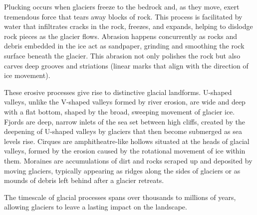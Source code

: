 Plucking occurs when glaciers freeze to the bedrock and, as they move, exert tremendous force that tears away blocks of rock. This process is facilitated by water that infiltrates cracks in the rock, freezes, and expands, helping to dislodge rock pieces as the glacier flows. Abrasion happens concurrently as rocks and debris embedded in the ice act as sandpaper, grinding and smoothing the rock surface beneath the glacier. This abrasion not only polishes the rock but also carves deep grooves and striations (linear marks that align with the direction of ice movement).

These erosive processes give rise to distinctive glacial landforms. U-shaped valleys, unlike the V-shaped valleys formed by river erosion, are wide and deep with a flat bottom, shaped by the broad, sweeping movement of glacier ice. Fjords are deep, narrow inlets of the sea set between high cliffs, created by the deepening of U-shaped valleys by glaciers that then become submerged as sea levels rise. Cirques are amphitheatre-like hollows situated at the heads of glacial valleys, formed by the erosion caused by the rotational movement of ice within them. Moraines are accumulations of dirt and rocks scraped up and deposited by moving glaciers, typically appearing as ridges along the sides of glaciers or as mounds of debris left behind after a glacier retreats.

The timescale of glacial processes spans over thousands to millions of years, allowing glaciers to leave a lasting impact on the landscape.


